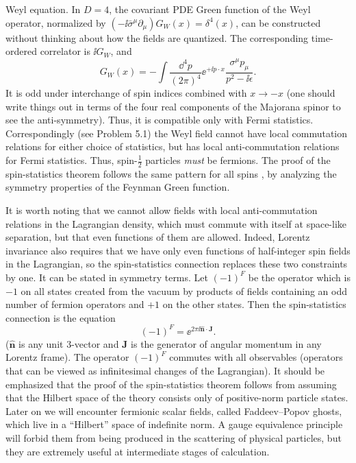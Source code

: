Weyl equation. In $D=4$, the covariant PDE Green function of the Weyl operator, normalized by
$(-\ii\bar\sigma^\mu\partial_\mu)G_W(x)=\delta^4(x)$, can be constructed
without thinking about how the fields are quantized. The corresponding time-ordered
correlator is $\ii G_W$, and
\begin{equation*}
  G_W(x)=-\int\frac{\dd^4p}{(2\pi)^4}\ee^{+\ii p\cdot x}
  \frac{\sigma^\mu p_\mu}{p^2-\ii\epsilon}.
\end{equation*}
It is odd under interchange of spin indices combined with $x\to-x$ (one should write
things out in terms of the four real components of the Majorana spinor to see the
anti-symmetry). Thus, it is compatible only with Fermi statistics. Correspondingly (see
Problem 5.1) the Weyl field cannot have local commutation relations for either choice
of statistics, but has local anti-commutation relations for Fermi statistics. Thus, spin-$\frac12$
particles \emph{must} be fermions. The proof of the spin-statistics theorem follows the same
pattern for all spins \cite{banks-ref-6,banks-ref-7,banks-ref-8}, by analyzing the symmetry properties of the Feynman Green
function.

It is worth noting that we cannot allow fields with local anti-commutation relations
in the Lagrangian density, which must commute with itself at space-like separation,
but that even functions of them are allowed. Indeed, Lorentz invariance also requires
that we have only even functions of half-integer spin fields in the Lagrangian, so the
spin-statistics connection replaces these two constraints by one. It can be stated in
symmetry terms. Let $(-1)^F$ be the operator which is $-1$ on all states created from the
vacuum by products of fields containing an odd number of fermion operators and $+1$
on the other states. Then the spin-statistics connection is the equation
\begin{equation*}
  (-1)^F=\ee^{2\pi\ii\hat{\mathbf n}\cdot\mathbf J}.
\end{equation*}
($\hat{\mathbf n}$ is any unit 3-vector and $\mathbf J$ is the generator of angular momentum in any Lorentz
frame). The operator $(-1)^F$ commutes with all observables (operators that can be
viewed as infinitesimal changes of the Lagrangian). It should be emphasized that the
proof of the spin-statistics theorem follows from assuming that the Hilbert space of
the theory consists only of positive-norm particle states. Later on we will encounter
fermionic scalar fields, called Faddeev--Popov ghosts, which live in a ``Hilbert'' space of
indefinite norm. A gauge equivalence principle will forbid them from being produced in
the scattering of physical particles, but they are extremely useful at intermediate stages
of calculation.

